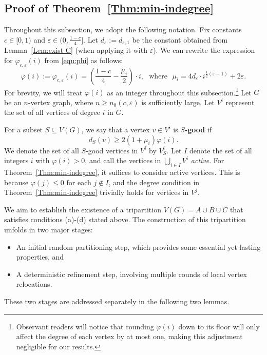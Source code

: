 \documentclass{aic}
\begin{document}
	\subsection{Proof of Theorem~\ref{Thm:min-indegree}}\label{subsec:pf-int-bisec}
	\noindent Throughout this subsection, we adopt the following notation.
	Fix constants $c\in [0,1)$ and $\varepsilon\in (0,\frac{1-c}{4}]$.
	Let $d_\varepsilon:=d_{\varepsilon,1}$ be the constant obtained from Lemma~\ref{Lem:exist C} (when applying it with $\varepsilon$).
	We can rewrite the expression for $\varphi_{c,\varepsilon}(i)$ from \eqref{equ:phi} as follows:
	\begin{equation}\label{equ:phi2}
		\varphi(i):=\varphi_{c,\varepsilon}(i)=\left(\frac{1-c}{4}-\frac{\mu_i}{2}\right)\cdot i, \mbox{~~where~~} \mu_i=4d_\varepsilon\cdot i^{\frac{1}{2}(\varepsilon-1)}+2\varepsilon.
	\end{equation}
	For brevity, we will treat $\varphi(i)$ as an integer throughout this subsection.\footnote{Observant readers will notice that rounding $\varphi(i)$ down to its floor will only affect the degree of each vertex by at most one, making this adjustment negligible for our results.}
	Let $G$ be an $n$-vertex graph, where $n\geq n_0(c,\varepsilon)$ is sufficiently large.
	Let $V^i$ represent the set of all vertices of degree $i$ in $G$.
	
	For a subset $S \subseteq V(G)$, we say that a vertex $v\in V^i$ is {\bf $S$-good} if
	\begin{equation}\label{equ:goodness}
		d_S(v)\ge 2(1+\mu_i)\varphi(i).
	\end{equation}
	We denote the set of all $S$-good vertices in $V^i$ by $V^i_S$.
	Let $I$ denote the set of all integers $i$ with $\varphi(i)>0$, and call the vertices in $\bigcup_{i\in I}V^i$ {\it active}.
	For Theorem~\ref{Thm:min-indegree}, it suffices to consider active vertices.
	This is because $\varphi(j) \leq 0$ for each $j\notin I$, and the degree condition in Theorem~\ref{Thm:min-indegree} trivially holds for vertices in $V^j$.
	
	We aim to establish the existence of a tripartition $V(G) = A \cup B \cup C$ that satisfies conditions (a)-(d) stated above.
	The construction of this tripartition unfolds in two major stages:
	\begin{itemize}
		\item An initial random partitioning step, which provides some essential yet lasting properties, and
		\item A deterministic refinement step, involving multiple rounds of local vertex relocations.
	\end{itemize}
	These two stages are addressed separately in the following two lemmas.
	
\end{document}
